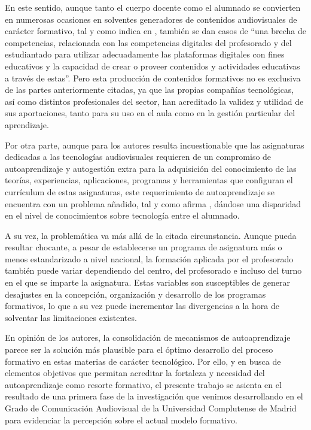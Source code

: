 \documentclass[spanish]{textolivre}
\begin{document}
En este sentido, aunque tanto el cuerpo docente como el alumnado se convierten en numerosas ocasiones en solventes generadores de contenidos audiovisuales de carácter formativo, tal y como indica \textcite{alcala_del_olmo_fernandez_competencias_2020} en \textcite[p. 2]{garcia-penalvo_evaluacion_2020}, también se dan casos de “una brecha de competencias, relacionada con las competencias digitales del profesorado y del estudiantado para utilizar adecuadamente las plataformas digitales con fines educativos y la capacidad de crear o proveer contenidos y actividades educativas a través de estas”. Pero esta producción de contenidos formativos no es exclusiva de las partes anteriormente citadas, ya que las propias compañías tecnológicas, así como distintos profesionales del sector, han acreditado la validez y utilidad de sus aportaciones, tanto para su uso en el aula como en la gestión particular del aprendizaje.

Por otra parte, aunque para los autores resulta incuestionable que las asignaturas dedicadas a las tecnologías audiovisuales requieren de un compromiso de autoaprendizaje y autogestión extra para la adquisición del conocimiento de las teorías, experiencias, aplicaciones, programas y herramientas que configuran el currículum de estas asignaturas, este requerimiento de autoaprendizaje se encuentra con un problema añadido, tal y como afirma \textcite{mejon_opiniones_2018}, %
dándose una disparidad en el nivel de conocimientos sobre tecnología entre el alumnado.

A su vez, la problemática va más allá de la citada circunstancia. Aunque pueda resultar chocante, a pesar de establecerse un programa de asignatura más o menos estandarizado a nivel nacional, la formación aplicada por el profesorado también puede variar dependiendo del centro, del profesorado e incluso del turno en el que se imparte la asignatura. Estas variables son susceptibles de generar desajustes en la concepción, organización y desarrollo de los programas formativos, lo que a su vez puede incrementar las divergencias a la hora de solventar las limitaciones existentes. 

En opinión de los autores, la consolidación de mecanismos de autoaprendizaje parece ser la solución más plausible para el óptimo desarrollo del proceso formativo en estas materias de carácter tecnológico. Por ello, y en busca de elementos objetivos que permitan acreditar la fortaleza y necesidad del autoaprendizaje como resorte formativo, el presente trabajo se asienta en el resultado de una primera fase de la investigación que venimos desarrollando en el Grado de Comunicación Audiovisual de la Universidad Complutense de Madrid para evidenciar la percepción sobre el actual modelo formativo. 
\end{document}
